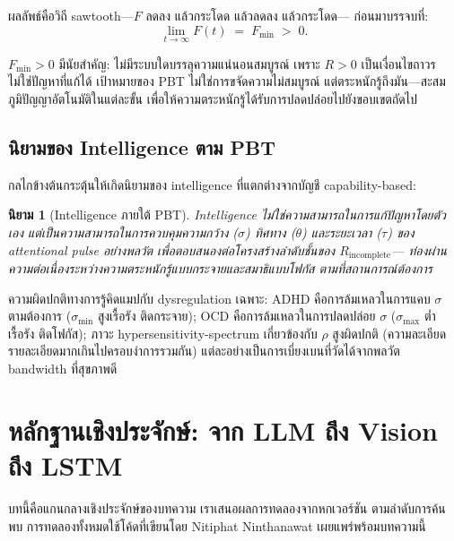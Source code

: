 \documentclass[12pt,a4paper]{article}
\newtheorem{definition}{นิยาม}[section]
\begin{document}
ผลลัพธ์คือวิถี sawtooth---$F$ ลดลง แล้วกระโดด แล้วลดลง แล้วกระโดด---
ก่อนมาบรรจบที่:
\begin{equation}
  \lim_{t\to\infty} F(t) \;=\; F_{\min} \;>\; 0.
  \label{eq:F_limit}
\end{equation}

$F_{\min} > 0$ มีนัยสำคัญ: ไม่มีระบบใดบรรลุความแน่นอนสมบูรณ์
เพราะ $R > 0$ เป็นเงื่อนไขถาวร ไม่ใช่ปัญหาที่แก้ได้
เป้าหมายของ PBT ไม่ใช่การขจัดความไม่สมบูรณ์
แต่ตระหนักรู้ถึงมัน---สะสมภูมิปัญญาอัตโนมัติในแต่ละขั้น
เพื่อให้ความตระหนักรู้ได้รับการปลดปล่อยไปยังขอบเขตถัดไป

\subsection{นิยามของ Intelligence ตาม PBT}

\begin{sloppypar}
กลไกข้างต้นกระตุ้นให้เกิดนิยามของ intelligence
ที่แตกต่างจากบัญชี capability-based:
\end{sloppypar}

\begin{definition}[Intelligence ภายใต้ PBT]
\begin{sloppypar}
Intelligence ไม่ใช่ความสามารถในการแก้ปัญหาโดยตัวเอง
แต่เป็นความสามารถในการควบคุมความกว้าง ($\sigma$) ทิศทาง ($\theta$)
และระยะเวลา ($\tau$) ของ attentional pulse อย่างพลวัต
เพื่อตอบสนองต่อโครงสร้างลำดับชั้นของ $R_{\mathrm{incomplete}}$---
ท่องผ่านความต่อเนื่องระหว่างความตระหนักรู้แบบกระจายและสมาธิแบบโฟกัส
ตามที่สถานการณ์ต้องการ
\end{sloppypar}
\end{definition}

ความผิดปกติทางการรู้คิดแมปกับ dysregulation เฉพาะ:
ADHD คือการล้มเหลวในการแคบ $\sigma$ ตามต้องการ
($\sigma_{\min}$ สูงเรื้อรัง ติดกระจาย);
OCD คือการล้มเหลวในการปลดปล่อย $\sigma$
($\sigma_{\max}$ ต่ำเรื้อรัง ติดโฟกัส);
ภาวะ hypersensitivity-spectrum เกี่ยวข้องกับ $\rho$ สูงผิดปกติ
(ความละเอียดรายละเอียดมากเกินไปครอบงำการรวมกัน)
แต่ละอย่างเป็นการเบี่ยงเบนที่วัดได้จากพลวัต bandwidth ที่สุขภาพดี


\FloatBarrier
\section{หลักฐานเชิงประจักษ์: จาก LLM ถึง Vision ถึง LSTM}
\label{sec:empirical}

บทนี้คือแกนกลางเชิงประจักษ์ของบทความ เราเสนอผลการทดลองจากหกเวอร์ชัน
ตามลำดับการค้นพบ การทดลองทั้งหมดใช้โค้ดที่เขียนโดย Nitiphat Ninthanawat
เผยแพร่พร้อมบทความนี้
\end{document}
